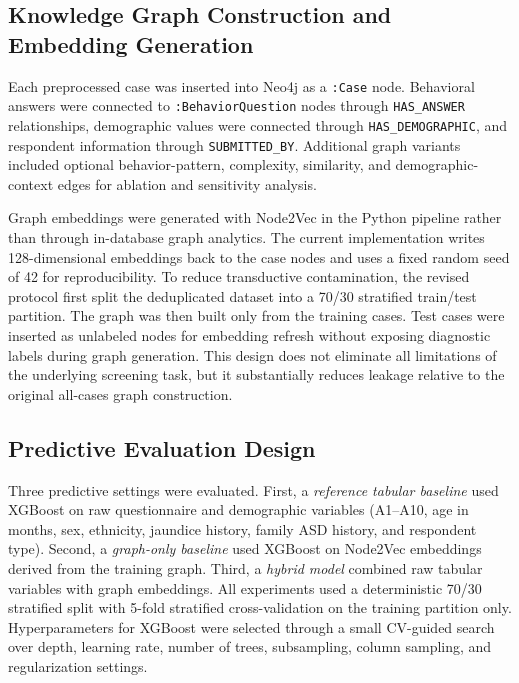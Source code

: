 \documentclass[pdflatex,sn-basic]{sn-jnl}%
\theoremstyle{thmstyleone}%
\theoremstyle{thmstyletwo}%
\theoremstyle{thmstylethree}%
\begin{document}
\subsection{Knowledge Graph Construction and Embedding Generation}

Each preprocessed case was inserted into Neo4j as a \texttt{:Case} node. Behavioral answers were connected to \texttt{:BehaviorQuestion} nodes through \texttt{HAS\_ANSWER} relationships, demographic values were connected through \texttt{HAS\_DEMOGRAPHIC}, and respondent information through \texttt{SUBMITTED\_BY}. Additional graph variants included optional behavior-pattern, complexity, similarity, and demographic-context edges for ablation and sensitivity analysis.

Graph embeddings were generated with Node2Vec in the Python pipeline rather than through in-database graph analytics. The current implementation writes 128-dimensional embeddings back to the case nodes and uses a fixed random seed of 42 for reproducibility. To reduce transductive contamination, the revised protocol first split the deduplicated dataset into a 70/30 stratified train/test partition. The graph was then built only from the training cases. Test cases were inserted as unlabeled nodes for embedding refresh without exposing diagnostic labels during graph generation. This design does not eliminate all limitations of the underlying screening task, but it substantially reduces leakage relative to the original all-cases graph construction.

\subsection{Predictive Evaluation Design}

Three predictive settings were evaluated. First, a \textit{reference tabular baseline} used XGBoost on raw questionnaire and demographic variables (A1--A10, age in months, sex, ethnicity, jaundice history, family ASD history, and respondent type). Second, a \textit{graph-only baseline} used XGBoost on Node2Vec embeddings derived from the training graph. Third, a \textit{hybrid model} combined raw tabular variables with graph embeddings. All experiments used a deterministic 70/30 stratified split with 5-fold stratified cross-validation on the training partition only. Hyperparameters for XGBoost were selected through a small CV-guided search over depth, learning rate, number of trees, subsampling, column sampling, and regularization settings.
\end{document}
